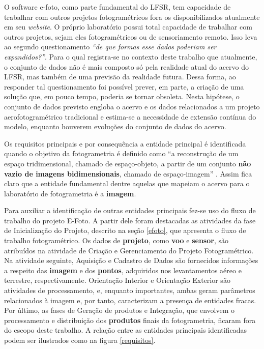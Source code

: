 O software e-foto, como parte fundamental do LFSR, tem capacidade de trabalhar com outros projetos fotogramétricos fora os disponibilizados atualmente em seu \textit{website}. O próprio laboratório possui total capacidade de trabalhar com outros projetos, sejam eles fotogramétricos ou de sensoriamento remoto. Isso leva ao segundo questionamento \textit{``de que formas esse dados poderiam ser expandidos?''}. Para o qual registra-se no contexto deste trabalho que atualmente, o conjunto de dados não é mais composto só pela realidade atual do acervo do LFSR, mas também de uma previsão da realidade futura. Dessa forma, ao responder tal questionamento foi possível prever, em parte, a criação de uma solução que, em pouco tempo, poderia se tornar obsoleta. Nesta hipótese, o conjunto de dados previsto engloba o acervo e os dados relacionados a um projeto aerofotogramétrico tradicional e estima-se a necessidade de extensão contínua do modelo, enquanto houverem evoluções do conjunto de dados do acervo.

Os requisitos principais e por consequência a entidade principal é identificada quando o objetivo da fotogrametria é definido como ``a reconstrução de um espaço tridimensional, chamado de espaço-objeto, a partir de um conjunto \textbf{não vazio de imagens bidimensionais}, chamado de espaço-imagem'' \cite[p.16]{coelho2007fotogrametria}. Assim fica claro que a entidade fundamental dentre aquelas que mapeiam o acervo para o laboratório de fotogrametria é a \textbf{imagem}. 

Para auxiliar a identificação de outras entidades principais fez-se uso do fluxo de trabalho do projeto E-Foto. A partir dele foram destacadas as atividades da fase de Inicialização do Projeto, descrito na seção \ref{efoto}, que apresenta o fluxo de trabalho fotogramétrico. Os dados de \textbf{projeto}, como \textbf{voo} e \textbf{sensor}, são atribuídos na atividade de Criação e Gerenciamento do Projeto Fotogramétrico. Na atividade seguinte, Aquisição e Cadastro de Dados são fornecidos informações a respeito das \textbf{imagem} e dos \textbf{pontos}, adquiridos nos levantamentos aéreo e terrestre, respectivamente. Orientação Interior e Orientação Exterior são atividades de processamento, e, enquanto importantes, ambas geram parâmetros relacionados à imagem e, por tanto, caracterizam a presença de entidades fracas. Por último, as fases de Geração de produtos e Integração, que envolvem o processamento e distribuição dos \textbf{produtos} finais da fotogrametria, ficaram fora do escopo deste trabalho. A relação entre as entidades principais identificadas podem ser ilustrados como na figura \ref{requisitos}.


